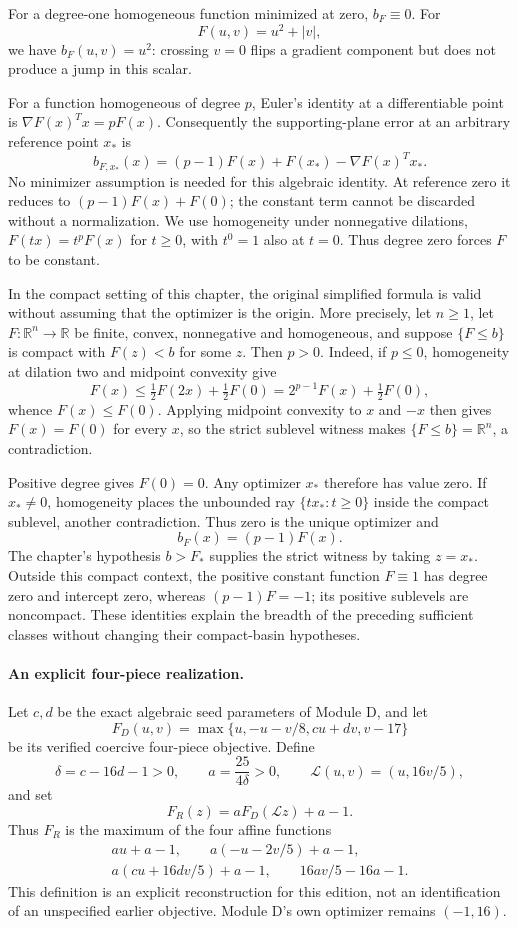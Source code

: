 For a degree-one homogeneous function minimized at zero, $b_F\equiv0$. For
\[
 F(u,v)=u^2+|v|,
\]
we have $b_F(u,v)=u^2$: crossing $v=0$ flips a gradient component but does not produce a jump in this scalar.

For a function homogeneous of degree $p$, Euler's identity at a differentiable point is $\nabla F(x)^Tx=pF(x)$. Consequently the supporting-plane error at an arbitrary reference point $x_*$ is
\[
 b_{F,x_*}(x)=(p-1)F(x)+F(x_*)-\nabla F(x)^Tx_*.
\]
No minimizer assumption is needed for this algebraic identity. At reference zero it reduces to $(p-1)F(x)+F(0)$; the constant term cannot be discarded without a normalization. We use homogeneity under nonnegative dilations, $F(tx)=t^pF(x)$ for $t\ge0$, with $t^0=1$ also at $t=0$. Thus degree zero forces $F$ to be constant.

In the compact setting of this chapter, the original simplified formula is valid without assuming that the optimizer is the origin. More precisely, let $n\ge1$, let $F:\mathbb R^n\to\mathbb R$ be finite, convex, nonnegative and homogeneous, and suppose $\{F\le b\}$ is compact with $F(z)<b$ for some $z$. Then $p>0$. Indeed, if $p\le0$, homogeneity at dilation two and midpoint convexity give
\[
 F(x)\le\tfrac12F(2x)+\tfrac12F(0)
       =2^{p-1}F(x)+\tfrac12F(0),
\]
whence $F(x)\le F(0)$. Applying midpoint convexity to $x$ and $-x$ then gives $F(x)=F(0)$ for every $x$, so the strict sublevel witness makes $\{F\le b\}=\mathbb R^n$, a contradiction.

Positive degree gives $F(0)=0$. Any optimizer $x_*$ therefore has value zero. If $x_*\ne0$, homogeneity places the unbounded ray $\{t x_*:t\ge0\}$ inside the compact sublevel, another contradiction. Thus zero is the unique optimizer and
\[
 b_F(x)=(p-1)F(x).
\]
The chapter's hypothesis $b>F_*$ supplies the strict witness by taking $z=x_*$. Outside this compact context, the positive constant function $F\equiv1$ has degree zero and intercept zero, whereas $(p-1)F=-1$; its positive sublevels are noncompact. These identities explain the breadth of the preceding sufficient classes without changing their compact-basin hypotheses.

\paragraph{An explicit four-piece realization.}
Let $c,d$ be the exact algebraic seed parameters of Module D, and let
\[
 F_D(u,v)=\max\{u,-u-v/8,cu+dv,v-17\}
\]
be its verified coercive four-piece objective. Define
\[
 \delta=c-16d-1>0,\qquad a=\frac{25}{4\delta}>0,
 \qquad \mathcal L(u,v)=(u,16v/5),
\]
and set
\[
 F_R(z)=aF_D(\mathcal L z)+a-1.
\]
Thus $F_R$ is the maximum of the four affine functions
\[
 \begin{gathered}
 au+a-1,\qquad a(-u-2v/5)+a-1,\\
 a(cu+16dv/5)+a-1,\qquad 16av/5-16a-1.
 \end{gathered}
\]
This definition is an explicit reconstruction for this edition, not an identification of an unspecified earlier objective. Module D's own optimizer remains $(-1,16)$.

